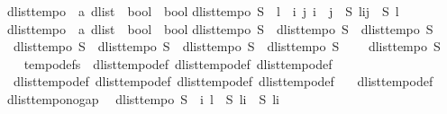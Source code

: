 \begin{isabellebody}
\isamarkupfalse%
\ dlist{\isacharunderscore}tempo{}\ {\isacharcolon}{\isacharcolon}\ {\isachardoublequoteopen}{\isacharparenleft}{\isacharprime}a\ dlist\ {\isasymRightarrow}\ bool{\isacharparenright}\ {\isasymRightarrow}\ bool{\isachardoublequoteclose}\isanewline
{}\isanewline
{\isachardoublequoteopen}dlist{\isacharunderscore}tempo{}\ S\ {\isasymequiv}\ {\isasymforall}l{\isachardot}\ {\isacharparenleft}{\isasymexists}\ i\ j{\isachardot}\ i\ {\isacharless}\ j\ {\isasymand}\ S\ {\isacharparenleft}l{\isasymdagger}i{\isachardot}{\isachardot}j{\isacharparenright}{\isacharparenright}\ {\isasymlongleftrightarrow}\ S\ l{\isachardoublequoteclose}\isanewline
\isanewline
{}\isamarkupfalse%
\ dlist{\isacharunderscore}tempo\ {\isacharcolon}{\isacharcolon}\ {\isachardoublequoteopen}{\isacharparenleft}{\isacharprime}a\ dlist\ {\isasymRightarrow}\ bool{\isacharparenright}\ {\isasymRightarrow}\ bool{\isachardoublequoteclose}\isanewline
{}\isanewline
{\isachardoublequoteopen}dlist{\isacharunderscore}tempo\ S\ {\isasymequiv}\ dlist{\isacharunderscore}tempo{}\ S\ {\isasymand}\ dlist{\isacharunderscore}tempo{}\ S\ {\isasymand}\ \isanewline
\ \ dlist{\isacharunderscore}tempo{}\ S\ {\isasymand}\ dlist{\isacharunderscore}tempo{}\ S\ {\isasymand}\ dlist{\isacharunderscore}tempo{}\ S\ {\isasymand}\ dlist{\isacharunderscore}tempo{}\ S\ {\isasymand}\ \isanewline
\ \ dlist{\isacharunderscore}tempo{}\ S{\isachardoublequoteclose}\isanewline
\ \ \isanewline
{}\isamarkupfalse%
\ tempo{\isacharunderscore}defs\ {\isacharequal}\ dlist{\isacharunderscore}tempo{\isacharunderscore}def\ dlist{\isacharunderscore}tempo{}{\isacharunderscore}def\ dlist{\isacharunderscore}tempo{}{\isacharunderscore}def\ \isanewline
\ \ dlist{\isacharunderscore}tempo{}{\isacharunderscore}def\ dlist{\isacharunderscore}tempo{}{\isacharunderscore}def\ dlist{\isacharunderscore}tempo{}{\isacharunderscore}def\ dlist{\isacharunderscore}tempo{}{\isacharunderscore}def\ \isanewline
\ \ dlist{\isacharunderscore}tempo{}{\isacharunderscore}def\isanewline
\isanewline
{}\isamarkupfalse%
\ dlist{\isacharunderscore}tempo{\isacharunderscore}{}{\isacharunderscore}no{\isacharunderscore}gap{\isacharcolon}\isanewline
\ \ {\isachardoublequoteopen}dlist{\isacharunderscore}tempo{}\ S\ {\isasymLongrightarrow}\ {\isasymforall}i\ l{\isachardot}\ {\isasymnot}\ {\isacharparenleft}{\isacharparenleft}S\ {\isacharparenleft}l{\isasymdagger}{\isachardot}{\isachardot}i{\isacharparenright}\ {\isasymand}\ S\ {\isacharparenleft}l{\isasymdagger}i{\isachardot}{\isachardot}{\isacharparenright}{\isacharparenright}{\isacharparenright}{\isachardoublequoteclose}\isanewline

\end{isabellebody}
